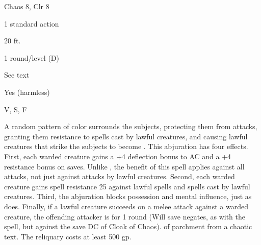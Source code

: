 
\begin{description*}
\item[Level:] Chaos 8, Clr 8
\item[Casting Time:] 1 standard action
\item[Range:] 20 ft.
\item[Duration:] 1 round/level (D)
\item[Saving Throw:] See text
\item[Spell Resistance:] Yes (harmless)
\item[Components:] V, S, F
\end{description*}

A random pattern of color surrounds the subjects, protecting them from attacks,
granting them resistance to spells cast by lawful creatures, and causing lawful
creatures that strike the subjects to become . This abjuration
has four effects.
First, each warded creature gains a +4 deflection bonus to AC and a +4 resistance
bonus on saves. Unlike , the benefit of this spell
applies against all attacks, not just against attacks by lawful creatures.
Second, each warded creature gains spell resistance 25 against lawful spells and
spells cast by lawful creatures.
Third, the abjuration blocks possession and mental influence, just as  does.
Finally, if a lawful creature succeeds on a melee attack against a warded creature,
the offending attacker is  for 1 round (Will save negates, as
with the  spell, but against the save DC of Cloak of Chaos).
of parchment from a chaotic text. The reliquary costs at least 500 gp.
